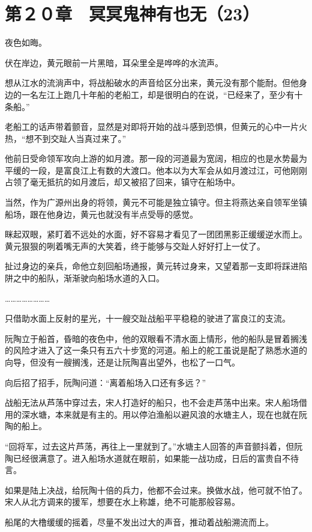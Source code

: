 \section{第２０章　冥冥鬼神有也无（23）}

夜色如晦。

伏在岸边，黄元眼前一片黑暗，耳朵里全是哗哗的水流声。

想从江水的流淌声中，将战船破水的声音给区分出来，黄元没有那个能耐。但他身边的一名左江上跑几十年船的老船工，却是很明白的在说，“已经来了，至少有十条船。”

老船工的话声带着颤音，显然是对即将开始的战斗感到恐惧，但黄元的心中一片火热，“想不到交趾人当真过来了。”

他前日受命领军攻向上游的如月渡。那一段的河道最为宽阔，相应的也是水势最为平缓的一段，是富良江上有数的大渡口。他本以为大军会从如月渡过江，可他刚刚占领了毫无抵抗的如月渡后，却又被招了回来，镇守在船场中。

当然，作为广源州出身的将领，黄元不可能是独立镇守。但主将燕达亲自领军坐镇船场，跟在他身边，黄元也就没有半点受辱的感觉。

眯起双眼，紧盯着不远处的水面，好不容易才看见了一团团黑影正缓缓逆水而上。黄元狠狠的咧着嘴无声的大笑着，终于能够与交趾人好好打上一仗了。

扯过身边的亲兵，命他立刻回船场通报，黄元转过身来，又望着那一支即将踩进陷阱之中的船队，渐渐驶向船场水道的入口。

……………………

只借助水面上反射的星光，十一艘交趾战船平平稳稳的驶进了富良江的支流。

阮陶立于船首，昏暗的夜色中，他的双眼看不清水面上情形，他的船队是冒着搁浅的风险才进入了这一条只有五六十步宽的河道。船上的舵工虽说是配了熟悉水道的向导，但没有一艘搁浅，还是让阮陶喜出望外，也松了一口气。

向后招了招手，阮陶问道：“离着船场入口还有多远？”

战船无法从芦荡中穿过去，宋人打造好的船只，也不会走芦荡中出来。宋人船场借用的深水塘，本来就是有主的。用以停泊渔船以避风浪的水塘主人，现在也就在阮陶的船上。

“回将军，过去这片芦荡，再往上一里就到了。”水塘主人回答的声音颤抖着，但阮陶已经很满意了。进入船场水道就在眼前，如果能一战功成，日后的富贵自不待言。

如果是陆上决战，给阮陶十倍的兵力，他都不会过来。换做水战，他可就不怕了。宋人从北方调来的援军，想要在水上称雄，绝不可能那般容易。

船尾的大橹缓缓的摇着，尽量不发出过大的声音，推动着战船溯流而上。

